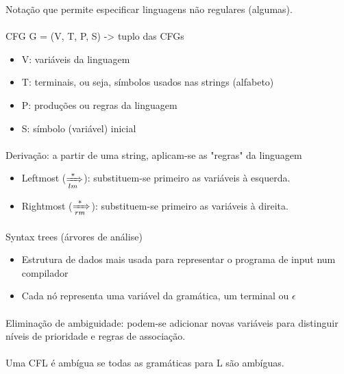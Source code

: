 \documentclass[../resumosTCOM.tex]{subfiles}
\begin{document}
 

Notação que permite especificar linguagens não regulares (algumas).

\paragraph{}

CFG G = (V, T, P, S) -> tuplo das CFGs
\begin{itemize}
    \item V: variáveis da linguagem
    \item T: terminais, ou seja, símbolos usados nas strings (alfabeto)
    \item P: produções ou regras da linguagem
    \item S: símbolo (variável) inicial
\end{itemize}

\paragraph{}

Derivação: a partir de uma string, aplicam-se as "regras" da linguagem
\begin{itemize}
    \item Leftmost ($\xRightarrow[lm]{*}$): substituem-se primeiro as variáveis à esquerda.
    \item Rightmost ($\xRightarrow[rm]{*}$): substituem-se primeiro as variáveis à direita.
\end{itemize}

\paragraph{}

Syntax trees (árvores de análise)
\begin{itemize}
    \item Estrutura de dados mais usada para representar o programa de input num compilador
    \item Cada nó representa uma variável da gramática, um terminal ou $\epsilon$
\end{itemize}

\paragraph{}

Eliminação de ambiguidade: podem-se adicionar novas variáveis para distinguir níveis de prioridade e regras de associação.

\paragraph{}

Uma CFL é ambígua se todas as gramáticas para L são ambíguas.
\end{document}
